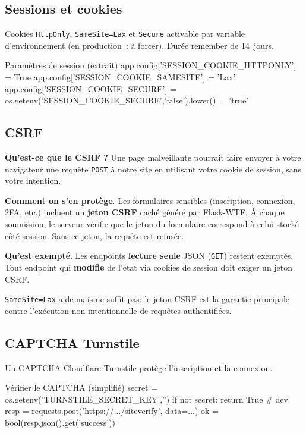 \subsection*{Sessions et cookies}
\noindent Cookies \texttt{HttpOnly}, \texttt{SameSite=Lax} et \texttt{Secure} activable par variable d'environnement (en production : à forcer). Durée \og remember \fg{} de 14~jours.
\begin{codebox}[language=Python]{Paramètres de session (extrait)}
app.config['SESSION_COOKIE_HTTPONLY'] = True
app.config['SESSION_COOKIE_SAMESITE'] = 'Lax'
app.config['SESSION_COOKIE_SECURE'] = os.getenv('SESSION_COOKIE_SECURE','false').lower()=='true'
\end{codebox}

\subsection*{CSRF}
\noindent \textbf{Qu'est-ce que le CSRF ?} Une page malveillante pourrait faire envoyer à votre navigateur une requête \texttt{POST} à notre site en utilisant votre cookie de session, sans votre intention.

\noindent \textbf{Comment on s'en protège}. Les formulaires sensibles (inscription, connexion, 2FA, etc.) incluent un \textbf{jeton CSRF} caché généré par Flask-WTF. À chaque soumission, le serveur vérifie que le jeton du formulaire correspond à celui stocké côté session. Sans ce jeton, la requête est refusée.

\noindent \textbf{Qu'est exempté}. Les endpoints \textbf{lecture seule} JSON (\texttt{GET}) restent exemptés. Tout endpoint qui \textbf{modifie} de l'état via cookies de session doit exiger un jeton CSRF.

\noindent \texttt{SameSite=Lax} aide mais ne suffit pas: le jeton CSRF est la garantie principale contre l'exécution non intentionnelle de requêtes authentifiées.

\subsection*{CAPTCHA Turnstile}
\noindent Un CAPTCHA Cloudflare Turnstile protège l'inscription et la connexion.
\begin{codebox}[language=Python]{Vérifier le CAPTCHA (simplifié)}
secret = os.getenv('TURNSTILE_SECRET_KEY','')
if not secret: return True  # dev
resp = requests.post('https://.../siteverify', data={...})
ok = bool(resp.json().get('success'))
\end{codebox}

